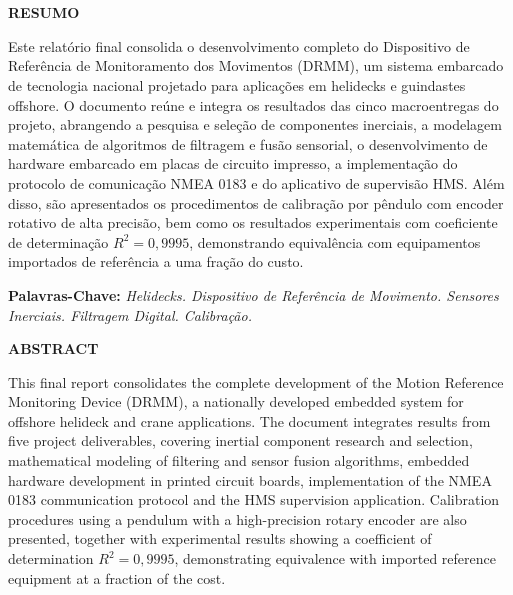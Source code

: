 \documentclass[a4paper, 12pt]{article}
\makeatletter
\renewcommand\tableofcontents{%
    \centering
    \section*{\contentsname
        \@mkboth{%
           \MakeUppercase\contentsname}{\MakeUppercase\contentsname}}%
    \@starttoc{toc}%
    }
\makeatother
\begin{document}
\raggedbottom


\pagestyle{modeloTexto}


\newpage
\tableofcontents
\newpage
\listoffigures
\listoftables

\newpage

\begin{center}
    \Large \textbf{RESUMO}
\end{center}
\vspace{0.3cm}
\justifying
Este relatório final consolida o desenvolvimento completo do Dispositivo de Referência de Monitoramento dos Movimentos (DRMM), um sistema embarcado de tecnologia nacional projetado para aplicações em helidecks e guindastes offshore. O documento reúne e integra os resultados das cinco macroentregas do projeto, abrangendo a pesquisa e seleção de componentes inerciais, a modelagem matemática de algoritmos de filtragem e fusão sensorial, o desenvolvimento de hardware embarcado em placas de circuito impresso, a implementação do protocolo de comunicação NMEA 0183 e do aplicativo de supervisão HMS. Além disso, são apresentados os procedimentos de calibração por pêndulo com encoder rotativo de alta precisão, bem como os resultados experimentais com coeficiente de determinação $R^2 = 0{,}9995$, demonstrando equivalência com equipamentos importados de referência a uma fração do custo.

\vspace{0.3cm}
\noindent\textbf{Palavras-Chave:} \textit{Helidecks. Dispositivo de Referência de Movimento. Sensores Inerciais. Filtragem Digital. Calibração.}

\vspace{1cm}

\begin{center}
    \Large \textbf{ABSTRACT}
\end{center}
\vspace{0.3cm}
\justifying
This final report consolidates the complete development of the Motion Reference Monitoring Device (DRMM), a nationally developed embedded system for offshore helideck and crane applications. The document integrates results from five project deliverables, covering inertial component research and selection, mathematical modeling of filtering and sensor fusion algorithms, embedded hardware development in printed circuit boards, implementation of the NMEA 0183 communication protocol and the HMS supervision application. Calibration procedures using a pendulum with a high-precision rotary encoder are also presented, together with experimental results showing a coefficient of determination $R^2 = 0{,}9995$, demonstrating equivalence with imported reference equipment at a fraction of the cost.
\end{document}
